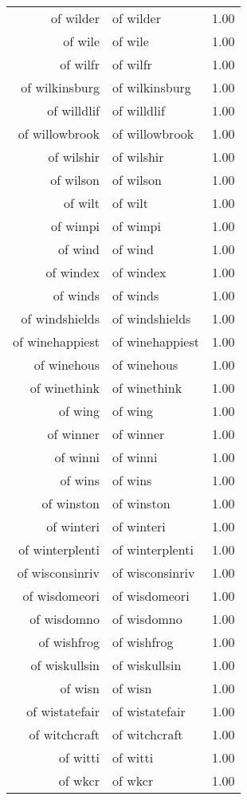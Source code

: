 \begin{table}[ht]
\begin{tabular}{rlr}
  of wilder & of wilder & 1.00 \\ 
  of wile & of wile & 1.00 \\ 
  of wilfr & of wilfr & 1.00 \\ 
  of wilkinsburg & of wilkinsburg & 1.00 \\ 
  of willdlif & of willdlif & 1.00 \\ 
  of willowbrook & of willowbrook & 1.00 \\ 
  of wilshir & of wilshir & 1.00 \\ 
  of wilson & of wilson & 1.00 \\ 
  of wilt & of wilt & 1.00 \\ 
  of wimpi & of wimpi & 1.00 \\ 
  of wind & of wind & 1.00 \\ 
  of windex & of windex & 1.00 \\ 
  of winds & of winds & 1.00 \\ 
  of windshields & of windshields & 1.00 \\ 
  of winehappiest & of winehappiest & 1.00 \\ 
  of winehous & of winehous & 1.00 \\ 
  of winethink & of winethink & 1.00 \\ 
  of wing & of wing & 1.00 \\ 
  of winner & of winner & 1.00 \\ 
  of winni & of winni & 1.00 \\ 
  of wins & of wins & 1.00 \\ 
  of winston & of winston & 1.00 \\ 
  of winteri & of winteri & 1.00 \\ 
  of winterplenti & of winterplenti & 1.00 \\ 
  of wisconsinriv & of wisconsinriv & 1.00 \\ 
  of wisdomeori & of wisdomeori & 1.00 \\ 
  of wisdomno & of wisdomno & 1.00 \\ 
  of wishfrog & of wishfrog & 1.00 \\ 
  of wiskullsin & of wiskullsin & 1.00 \\ 
  of wisn & of wisn & 1.00 \\ 
  of wistatefair & of wistatefair & 1.00 \\ 
  of witchcraft & of witchcraft & 1.00 \\ 
  of witti & of witti & 1.00 \\ 
  of wkcr & of wkcr & 1.00 \\ 

\end{tabular}
\end{table}
